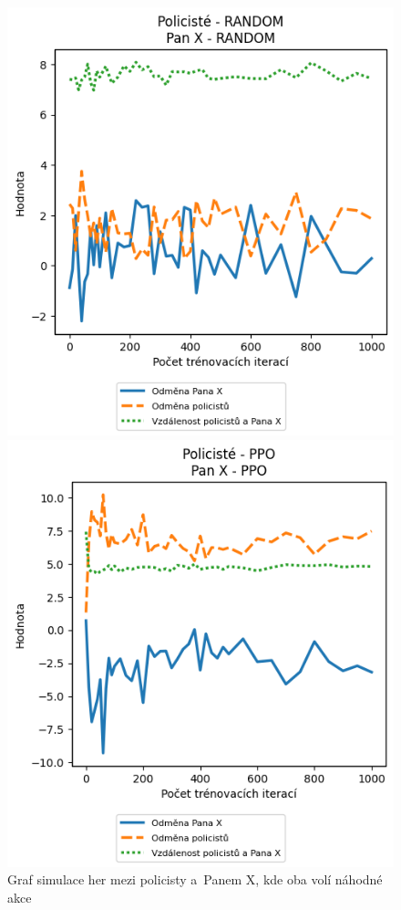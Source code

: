 \begin{figure}[H]
  \centering
  \begin{minipage}{.48\textwidth}
    \centering
    \includegraphics[width=1\textwidth]{obrazky-figures/graphs/cop_RANDOM_mrx_RANDOM}
    \caption{Graf simulace her mezi policisty a~Panem X, kde oba volí náhodné akce}
    \label{fig:cop_random_mrx_random}
  \end{minipage}\hfill
  \begin{minipage}{.48\textwidth}
    \centering
    \includegraphics[width=1\textwidth]{obrazky-figures/graphs/cop_PPO_mrx_PPO}

\end{minipage}
\end{figure}
